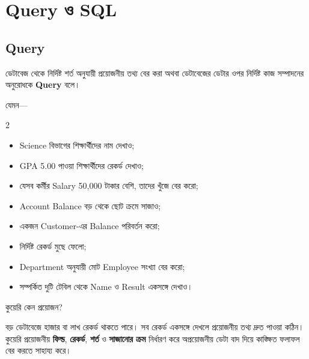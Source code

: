 

\section{Query ও SQL}



\subsection{Query}

\begin{definitionbox}{}

ডেটাবেজ থেকে নির্দিষ্ট শর্ত অনুযায়ী প্রয়োজনীয় তথ্য বের করা
অথবা ডেটাবেজের ডেটার ওপর নির্দিষ্ট কাজ সম্পাদনের অনুরোধকে
\textbf{Query} বলে।

\end{definitionbox}

যেমন—

\begin{multicols}{2}
\begin{itemize}

\item Science বিভাগের শিক্ষার্থীদের নাম দেখাও;

\item GPA 5.00 পাওয়া শিক্ষার্থীদের রেকর্ড দেখাও;

\item যেসব কর্মীর Salary 50,000 টাকার বেশি, তাদের খুঁজে বের করো;

\item Account Balance বড় থেকে ছোট ক্রমে সাজাও;

\item একজন Customer-এর Balance পরিবর্তন করো;

\item নির্দিষ্ট রেকর্ড মুছে ফেলো;

\item Department অনুযায়ী মোট Employee সংখ্যা বের করো;

\item সম্পর্কিত দুটি টেবিল থেকে Name ও Result একসঙ্গে দেখাও।

\end{itemize}
\end{multicols}

\begin{keypointbox}{কুয়েরি কেন প্রয়োজন?}

বড় ডেটাবেজে হাজার বা লাখ রেকর্ড থাকতে পারে। সব রেকর্ড একসঙ্গে
দেখলে প্রয়োজনীয় তথ্য দ্রুত পাওয়া কঠিন। কুয়েরি প্রয়োজনীয়
\textbf{ফিল্ড}, \textbf{রেকর্ড}, \textbf{শর্ত} ও
\textbf{সাজানোর ক্রম} নির্ধারণ করে অপ্রয়োজনীয় ডেটা বাদ দিয়ে কাঙ্ক্ষিত
ফলাফল বের করতে সাহায্য করে।

\end{keypointbox}

